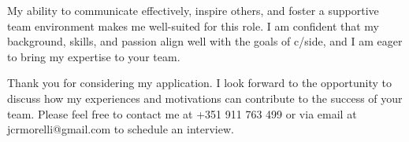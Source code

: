 \documentclass[11pt, a4paper]{awesome-cv}
\begin{document}
\begin{cvletter}
My ability to communicate effectively, inspire others, and foster a supportive team environment makes me well-suited for this role. I am confident that my background, skills, and passion align well with the goals of c/side, and I am eager to bring my expertise to your team.

Thank you for considering my application. I look forward to the opportunity to discuss how my experiences and motivations can contribute to the success of your team. Please feel free to contact me at +351 911 763 499 or via email at jcrmorelli@gmail.com to schedule an interview.

\end{cvletter}


\makeletterclosing
\end{document}
